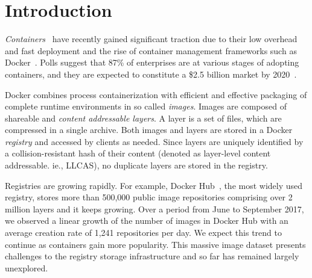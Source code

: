 \section{Introduction}

\emph{Containers}~\cite{process-containers-linux} have recently gained
significant traction due to their low overhead and fast deployment and
the rise of container management frameworks such as Docker~\cite{docker}.
%
Polls suggest that 87\% of enterprises are at various stages of adopting
containers, and they are expected to constitute a \$2.5 billion
market by 2020~\cite{container-grow-by2020}.

Docker combines process containerization with efficient and effective packaging
of complete runtime environments in so called {\em images}.
%
Images are composed of shareable and {\em content addressable layers}.
%
A layer is a set of files, which are compressed in a single archive.
%
Both images and layers are stored in a Docker \emph{registry} and accessed by
clients as needed.
%
Since layers are uniquely identified by a collision-resistant hash of
their content (denoted as layer-level content addressable. ie., LLCAS), no duplicate layers are stored in the registry.

Registries are growing rapidly.
%
For example, Docker Hub~\cite{docker-hub}, the most widely used registry,
stores more than 500,000 public image repositories comprising over 2 million
layers and it keeps growing.
%
Over a period from June to September 2017, we observed a linear growth of the number
of images in Docker Hub with an average creation rate of 1,241 repositories per day.
%
We expect this trend to continue as containers gain more popularity.
%
%
This massive image dataset presents challenges to the registry storage
infrastructure and so far has remained largely unexplored.

